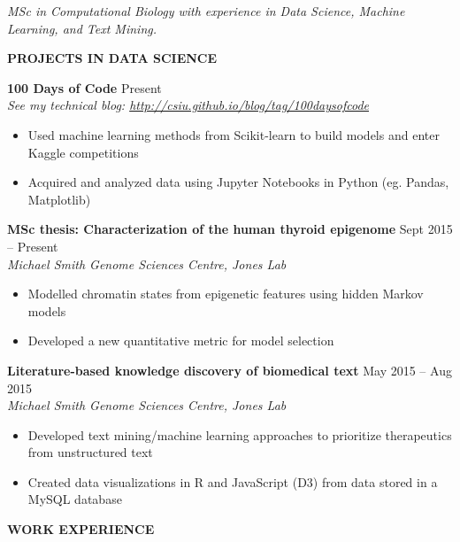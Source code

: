 \documentclass{res}
\renewcommand{\section}[1]{%
  \vspace{0.3in}%
  \centerline{\uppercase{\bf{#1}}}%
  \vspace{-6pt}}
\newcommand{\linehead}[2]{%
  {\bf #1} \hfill #2\\}
\newcommand{\linetitle}[1]{%
  {\sl #1}}
\begin{document}
\begin{resume}


\vspace{-1em}
\begin{center}
  {\it MSc in Computational Biology with experience in Data Science, Machine Learning, and Text Mining.}
\end{center}
\vspace{-1.5em}

\section{Projects in Data science}

\linehead{100 Days of Code}{Present}
\linetitle{See my technical blog: \url{http://csiu.github.io/blog/tag/100daysofcode}}
\begin{itemize}
  \item Used machine learning methods from Scikit-learn to build models and enter Kaggle competitions
  \item Acquired and analyzed data using Jupyter Notebooks in Python (eg. Pandas, Matplotlib)
\end{itemize}

\linehead{MSc thesis: Characterization of the human thyroid epigenome}{Sept 2015 -- Present}
\linetitle{Michael Smith Genome Sciences Centre, Jones Lab}
\begin{itemize}
  \item Modelled chromatin states from epigenetic features using hidden Markov models
  \item Developed a new quantitative metric for model selection
\end{itemize}

\linehead{Literature-based knowledge discovery of biomedical text}{May 2015 -- Aug 2015}
\linetitle{Michael Smith Genome Sciences Centre, Jones Lab}
\begin{itemize}
  \item Developed text mining/machine learning approaches to prioritize therapeutics from unstructured text
  \item Created data visualizations in R and JavaScript (D3) from data stored in a MySQL database
\end{itemize}

\section{Work Experience}


\end{resume}
\end{document}
